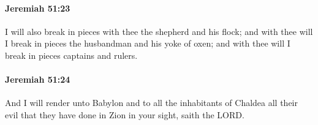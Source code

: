 		\paragraph{Jeremiah 51:23} %
			\label{JEREMIAH-51-23}

			I will also break in pieces with thee the shepherd and his flock; and with thee will I break in pieces the husbandman and his yoke of oxen; and with thee will I break in pieces captains and rulers.


		\paragraph{Jeremiah 51:24} %
			\label{JEREMIAH-51-24}

			And I will render unto Babylon and to all the inhabitants of Chaldea all their evil that they have done in Zion in your sight, saith the LORD.


